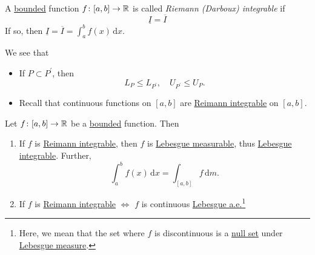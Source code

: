 \begin{definition}\label{def:Riemann-integrable}
	A \underline{bounded} function \(f\colon [a, b]\to \mathbb{\MakeUppercase{r}} \) is called \emph{Riemann (Darboux) integrable}
	if
	\[
		\underline{I} = \overline{I}
	\]
	If so, then \(\underline{I} = \overline{I} = \int_{a}^{b} f(x) \,\mathrm{d}x\).
\end{definition}
\begin{note}
	We see that
	\begin{itemize}
		\item If \(P\subset P ^\prime \), then
		      \[
			      L_{P}\leq L_{P ^\prime },\quad U_{P ^\prime }\leq U_{P}.
		      \]
		\item Recall that continuous functions on \([a, b]\) are \hyperref[def:Riemann-integrable]{Reimann integrable} on \([a, b]\).
	\end{itemize}
\end{note}
\begin{theorem}
	Let \(f\colon [a, b]\to \mathbb{\MakeUppercase{r}} \) be a \underline{bounded} function. Then
	\begin{enumerate}
		\item If \(f\) is \hyperref[def:Riemann-integrable]{Reimann integrable}, then \(f\) is \hyperref[def:measurable-function]{Lebesgue measurable}, thus
		      \hyperref[def:integrable]{Lebesgue integrable}. Further,
		      \[
			      \int_{a}^{b} f(x) \,\mathrm{d}x = \int_{[a, b]}f \,\mathrm{d}m.
		      \]
		\item If \(f\) is \hyperref[def:Riemann-integrable]{Reimann integrable} \(\iff \) \(f\) is continuous \underline{Lebesgue \hyperref[def:mu-almost-everywhere]{a.e.}}\footnote{Here, we
			      mean that the set where \(f\) is discontinuous is a \hyperref[def:mu-null-set]{null set} under \hyperref[def:Lebesgue-measure]{Lebesgue measure}.}
	\end{enumerate}
\end{theorem}
